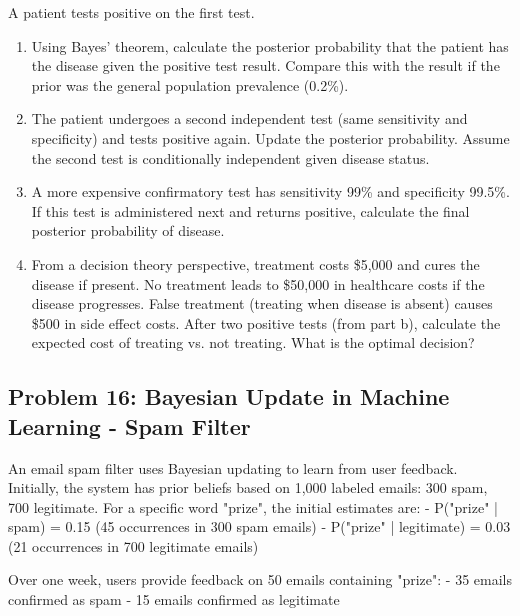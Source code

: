 \documentclass[12pt]{article}
\begin{document}
A patient tests positive on the first test.

\begin{enumerate}[label=(\alph*)]
\item Using Bayes' theorem, calculate the posterior probability that the patient has the disease given the positive test result. Compare this with the result if the prior was the general population prevalence (0.2\%).

\item The patient undergoes a second independent test (same sensitivity and specificity) and tests positive again. Update the posterior probability. Assume the second test is conditionally independent given disease status.

\item A more expensive confirmatory test has sensitivity 99\% and specificity 99.5\%. If this test is administered next and returns positive, calculate the final posterior probability of disease.

\item From a decision theory perspective, treatment costs \$5,000 and cures the disease if present. No treatment leads to \$50,000 in healthcare costs if the disease progresses. False treatment (treating when disease is absent) causes \$500 in side effect costs. After two positive tests (from part b), calculate the expected cost of treating vs. not treating. What is the optimal decision?
\end{enumerate}

\subsection*{Problem 16: Bayesian Update in Machine Learning - Spam Filter}

An email spam filter uses Bayesian updating to learn from user feedback. Initially, the system has prior beliefs based on 1,000 labeled emails: 300 spam, 700 legitimate. For a specific word "prize", the initial estimates are:
- P("prize" | spam) = 0.15 (45 occurrences in 300 spam emails)
- P("prize" | legitimate) = 0.03 (21 occurrences in 700 legitimate emails)

Over one week, users provide feedback on 50 emails containing "prize":
- 35 emails confirmed as spam
- 15 emails confirmed as legitimate
\end{document}
